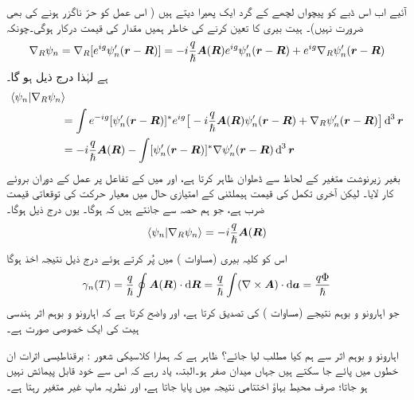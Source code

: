  آئیے اب اس ڈبے کو پیچواں لچھے کے گرد ایک پھیرا دیتے ہیں ( اس عمل کو حرّ ناگزر ہونے کی بھی ضرورت نہیں)۔ ہیت بیری کا تعین کرنے کی خاطر ہمیں
 مقدار  کی قیمت درکار ہوگی۔چونکہ 
\begin{align*}
\nabla_R \psi_n = \nabla_R [e^{i g} \psi'_n ({{\boldsymbol{r}}} - {{\boldsymbol{R}}})] = -i \frac{q}{\hslash} {{\boldsymbol{A}}} ({{\boldsymbol{R}}}) e^{i g} \psi'_n ({{\boldsymbol{r}}} - {{\boldsymbol{R}}}) + e^{i g} \nabla_R \psi'_n ({{\boldsymbol{r}}} - {{\boldsymbol{R}}})
\end{align*}
ہے لہٰذا درج ذیل ہو گا۔ 
\begin{align}
\langle \psi_n | \nabla_R \psi_n &\rangle \nonumber\\
&= \int e^{- i g} [\psi'_n (\kvec{r} - \kvec{R})]^{*} e^{i g} \big [ - i \frac{q}{\hslash} \kvec{A} (\kvec{R}) \psi'_n (\kvec{r} - \kvec{R}) + \nabla_R \psi'_n (\kvec{r} - \kvec{R}) \big ] \dif^{\,3} \kvec{r} \nonumber\\
&= - i \frac{q}{\hslash} \kvec{A} (\kvec{R}) - \int [\psi'_n (\kvec{r} - \kvec{R})]^{*} \nabla \psi'_n (\kvec{r} - \kvec{R}) \dif^{\,3} \kvec{r}
\end{align}
بغیر زیرنوشت  متغیر  کے لحاظ سے ڈھلوان ظاہر کرتا ہے، اور میں  کے تفاعل پر عمل کے
 دوران  بروئے کار لایا۔ لیکن آخری تکمل کی قیمت ہیملٹنی  کے امتیازی حال میں معیار حرکت کی توقعاتی قیمت
 ضرب  ہے، جو ہم حصہ  سے جانتے ہیں کہ  ہوگا۔ یوں درج ذیل ہوگا۔
\begin{align}
\langle \psi_n | \nabla_R \psi_n \rangle = - i \frac{q}{\hslash} {{\boldsymbol{A}}} ({{\boldsymbol{R}}})
\end{align}
اس کو کلیہ بیری (مساوات ) میں پُر کرتے ہوئے درج ذیل نتیجہ اخذ ہوگا 
\begin{align}
\gamma_n (T) = \frac{q}{\hslash} \oint \kvec{A} (\kvec{R}) \cdot \dif \kvec{R} = \frac{q}{\hslash} \int (\nabla \times \kvec{A}) \cdot \dif \kvec{a} = \frac{q \Phi}{\hslash}
\end{align}
جو اہارونو و بوہم نتیجے (مساوات ) کی تصدیق کرتا ہے، اور واضح کرتا ہے کہ اہارونو و بوہم اثر ہندسی ہیت کی ایک خصوصی صورت ہے۔

اہارونو و بوہم اثر سے ہم کیا مطلب لیا جائے؟ ظاہر ہے کہ ہمارا کلاسیکی شعور : برقناطیسی اثرات ان خطوں میں پائے جا سکتے ہیں جہاں میدان صفر ہو۔البتہ، یاد رہے کہ اس سے  خود قابل پیمائش نہیں ہو جاتا؛ صرف محیط بہاؤ اختتامی نتیجہ میں پایا جاتا ہے، اور نظریہ ماپ غیر متغیر رہتا ہے۔

